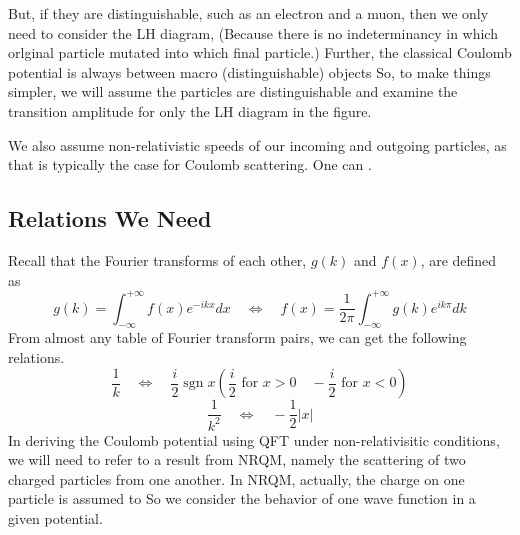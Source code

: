  But, if they are distinguishable, such as an electron and a muon, then we only need to consider the LH diagram, (Because there is no indeterminancy in which orlginal particle mutated into which final particle.) Further, the classical Coulomb potential is always between macro (distinguishable) objects So, to make things simpler, we will assume the particles are distinguishable and examine the transition amplitude for only the LH diagram in the figure.

We also assume non-relativistic speeds of our incoming and outgoing particles, as that is typically the case for Coulomb scattering. One can .

\subsection{Relations We Need}
Recall that the Fourier transforms of each other, $g(k)$ and $f(x)$, are defined as
\begin{equation}g(k)=\int_{-\infty}^{+\infty} f(x) e^{-i k x} d x \quad \Leftrightarrow \quad f(x)=\frac{1}{2 \pi} \int_{-\infty}^{+\infty} g(k) e^{i k \pi} d k\end{equation}
From almost any table of Fourier transform pairs, we can get the following relations.
\begin{equation}\frac{1}{k} \quad \Leftrightarrow \quad \frac{i}{2} \operatorname{sgn} x\left(\frac{i}{2} \text { for } x>0 \quad-\frac{i}{2} \text { for } x<0\right)\end{equation}
\begin{equation}\frac{1}{k^{2}} \quad \Leftrightarrow \quad-\frac{1}{2}|x|\end{equation}
In deriving the Coulomb potential using QFT under non-relativisitic conditions, we will need to refer to a result from NRQM, namely the scattering of two charged particles from one another. In NRQM, actually, the charge on one particle is assumed to  So we consider the behavior of one wave function in a given potential.

